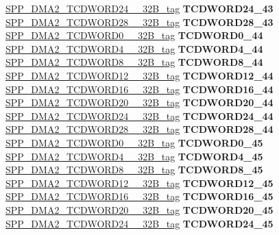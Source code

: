 \begin{DoxyCompactItemize}
\begin{tabbing}
\>\>\mbox{\hyperlink{unionSPP__DMA2__TCDWORD24____32B__tag}{SPP\_DMA2\_TCDWORD24\_\_32B\_tag}} {\bfseries TCDWORD24\_43}\\
\>\>\mbox{\hyperlink{unionSPP__DMA2__TCDWORD28____32B__tag}{SPP\_DMA2\_TCDWORD28\_\_32B\_tag}} {\bfseries TCDWORD28\_43}\\
\>\>\mbox{\hyperlink{unionSPP__DMA2__TCDWORD0____32B__tag}{SPP\_DMA2\_TCDWORD0\_\_32B\_tag}} {\bfseries TCDWORD0\_44}\\
\>\>\mbox{\hyperlink{unionSPP__DMA2__TCDWORD4____32B__tag}{SPP\_DMA2\_TCDWORD4\_\_32B\_tag}} {\bfseries TCDWORD4\_44}\\
\>\>\mbox{\hyperlink{unionSPP__DMA2__TCDWORD8____32B__tag}{SPP\_DMA2\_TCDWORD8\_\_32B\_tag}} {\bfseries TCDWORD8\_44}\\
\>\>\mbox{\hyperlink{unionSPP__DMA2__TCDWORD12____32B__tag}{SPP\_DMA2\_TCDWORD12\_\_32B\_tag}} {\bfseries TCDWORD12\_44}\\
\>\>\mbox{\hyperlink{unionSPP__DMA2__TCDWORD16____32B__tag}{SPP\_DMA2\_TCDWORD16\_\_32B\_tag}} {\bfseries TCDWORD16\_44}\\
\>\>\mbox{\hyperlink{unionSPP__DMA2__TCDWORD20____32B__tag}{SPP\_DMA2\_TCDWORD20\_\_32B\_tag}} {\bfseries TCDWORD20\_44}\\
\>\>\mbox{\hyperlink{unionSPP__DMA2__TCDWORD24____32B__tag}{SPP\_DMA2\_TCDWORD24\_\_32B\_tag}} {\bfseries TCDWORD24\_44}\\
\>\>\mbox{\hyperlink{unionSPP__DMA2__TCDWORD28____32B__tag}{SPP\_DMA2\_TCDWORD28\_\_32B\_tag}} {\bfseries TCDWORD28\_44}\\
\>\>\mbox{\hyperlink{unionSPP__DMA2__TCDWORD0____32B__tag}{SPP\_DMA2\_TCDWORD0\_\_32B\_tag}} {\bfseries TCDWORD0\_45}\\
\>\>\mbox{\hyperlink{unionSPP__DMA2__TCDWORD4____32B__tag}{SPP\_DMA2\_TCDWORD4\_\_32B\_tag}} {\bfseries TCDWORD4\_45}\\
\>\>\mbox{\hyperlink{unionSPP__DMA2__TCDWORD8____32B__tag}{SPP\_DMA2\_TCDWORD8\_\_32B\_tag}} {\bfseries TCDWORD8\_45}\\
\>\>\mbox{\hyperlink{unionSPP__DMA2__TCDWORD12____32B__tag}{SPP\_DMA2\_TCDWORD12\_\_32B\_tag}} {\bfseries TCDWORD12\_45}\\
\>\>\mbox{\hyperlink{unionSPP__DMA2__TCDWORD16____32B__tag}{SPP\_DMA2\_TCDWORD16\_\_32B\_tag}} {\bfseries TCDWORD16\_45}\\
\>\>\mbox{\hyperlink{unionSPP__DMA2__TCDWORD20____32B__tag}{SPP\_DMA2\_TCDWORD20\_\_32B\_tag}} {\bfseries TCDWORD20\_45}\\
\>\>\mbox{\hyperlink{unionSPP__DMA2__TCDWORD24____32B__tag}{SPP\_DMA2\_TCDWORD24\_\_32B\_tag}} {\bfseries TCDWORD24\_45}\\

\end{tabbing}
\end{DoxyCompactItemize}
